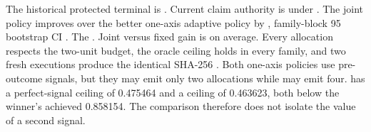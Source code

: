 \markdownRendererDocumentBegin
\markdownRendererSectionBegin
{}\markdownRendererInterblockSeparator
{}The historical protected terminal is . Current claim authority is  under .\markdownRendererInterblockSeparator
{}\markdownRendererInterblockSeparator
{}The joint policy improves over the better one-axis adaptive policy by , family-block 95\markdownRendererPercentSign{} bootstrap CI \markdownRendererStrongEmphasis{\markdownRendererCodeSpan{[0.286008, 0.382693]}}.\markdownRendererInterblockSeparator
{}The . Joint versus fixed  gain is  on average. Every allocation respects the two-unit budget, the oracle ceiling holds in every family, and two fresh executions produce the identical SHA-256\markdownRendererInterblockSeparator
{}.\markdownRendererInterblockSeparator
{}\markdownRendererSectionBegin
{}\markdownRendererInterblockSeparator
{}Both one-axis policies use pre-outcome signals, but they may emit only two allocations while  may emit four.  has a perfect-signal ceiling of 0.475464 and  a ceiling of 0.463623, both below the winner's achieved 0.858154. The comparison therefore does not isolate the value of a second signal.\markdownRendererInterblockSeparator
